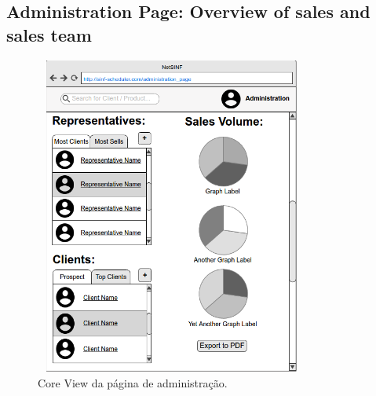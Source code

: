 \begin{titlepage}
\subsection{Administration Page: Overview of sales and sales team}

\begin{figure}[H]
  \centering
    \includegraphics[width=9cm, height = 10.5cm]{SINF_administrationpage.png}
  \caption{Core View da página de administração.}
  \label{uml}
\end{figure}


\end{titlepage}
